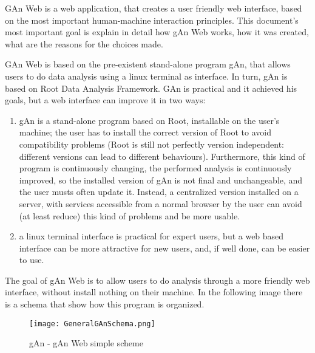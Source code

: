 GAn Web is a web application, that creates a user friendly web interface, based on the most important human-machine interaction principles.
This document's most important goal is explain in detail how gAn Web works, how it was created, what are the reasons for the choices made. 

GAn Web is based on the pre-existent stand-alone program gAn, that allows users to do data analysis using a linux terminal as interface. In turn, gAn is based on Root Data Analysis Framework. GAn is practical and it achieved his goals, but a web interface can improve it in two ways:

\begin{enumerate}

\item gAn is a stand-alone program based on Root, installable on the user's machine; the user has to install the correct version of Root to avoid compatibility problems (Root is still not perfectly version independent: different versions can lead to different behaviours). Furthermore, this kind of program is continuously changing, the performed analysis is continuously improved, so the installed version of gAn is not final and unchangeable, and the user musts often update it. Instead, a centralized version installed on a server, with services accessible from a normal browser by the user can avoid (at least reduce) this kind of problems and be more usable.    
 

\item a linux terminal interface is practical for expert users, but a web based interface can be more attractive for new users, and, if well done, can be easier to use.  


\end{enumerate}


The goal of gAn Web is to allow users to do analysis through a more friendly web interface, without install nothing on their machine. In the following image there is a schema that show how this program is organized.

\begin{figure}[H]
\centering
\texttt{[image: GeneralGAnSchema.png]} 
\caption{gAn - gAn Web simple scheme}
\end{figure}

